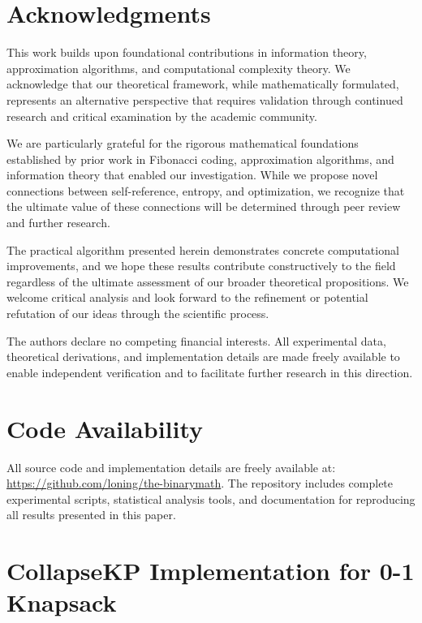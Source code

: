 \documentclass[11pt]{article}
\theoremstyle{remark}
\theoremstyle{definition}
\begin{document}
\section*{Acknowledgments}

This work builds upon foundational contributions in information theory, approximation algorithms, and computational complexity theory. We acknowledge that our theoretical framework, while mathematically formulated, represents an alternative perspective that requires validation through continued research and critical examination by the academic community.

We are particularly grateful for the rigorous mathematical foundations established by prior work in Fibonacci coding, approximation algorithms, and information theory that enabled our investigation. While we propose novel connections between self-reference, entropy, and optimization, we recognize that the ultimate value of these connections will be determined through peer review and further research.

The practical algorithm presented herein demonstrates concrete computational improvements, and we hope these results contribute constructively to the field regardless of the ultimate assessment of our broader theoretical propositions. We welcome critical analysis and look forward to the refinement or potential refutation of our ideas through the scientific process.

The authors declare no competing financial interests. All experimental data, theoretical derivations, and implementation details are made freely available to enable independent verification and to facilitate further research in this direction.

\section*{Code Availability}

All source code and implementation details are freely available at: \url{https://github.com/loning/the-binarymath}. The repository includes complete experimental scripts, statistical analysis tools, and documentation for reproducing all results presented in this paper.

\appendix

\section{CollapseKP Implementation for 0-1 Knapsack}
\label{app:implementation}
\end{document}
